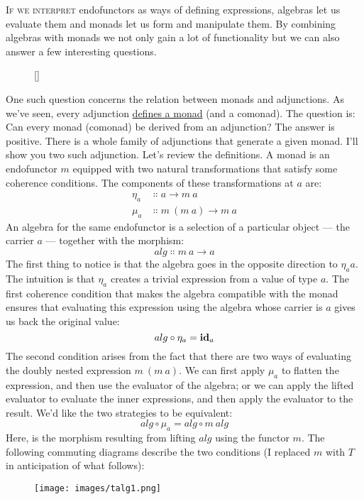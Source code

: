 \lettrine[lhang=0.17]{I}{f we interpret} endofunctors as ways of defining expressions, algebras
let us evaluate them and monads let us form and manipulate them. By
combining algebras with monads we not only gain a lot of functionality
but we can also answer a few interesting questions.
\begin{wrapfigure}[8]{R}{0pt}
\raisebox{0pt}[\dimexpr{}\baselineskip\relax]{
}%
\end{wrapfigure}

One such question
concerns the relation between monads and adjunctions. As we've seen,
every adjunction \hyperref[monads-categorically]{defines
a monad} (and a comonad). The question is: Can every monad (comonad) be
derived from an adjunction? The answer is positive. There is a whole
family of adjunctions that generate a given monad. I'll show you two
such adjunction.
Let's review the definitions. A monad is an endofunctor $m$
equipped with two natural transformations that satisfy some coherence
conditions. The components of these transformations at $a$ are:
\begin{align*}
\eta_a &\Colon a \to m\ a \\
\mu_a &\Colon m\ (m\ a) \to m\ a
\end{align*}
An algebra for the same endofunctor is a selection of a particular
object --- the carrier $a$ --- together with the morphism:
\[alg \Colon m\ a \to a\]
The first thing to notice is that the algebra goes in the opposite
direction to $\eta_aa$. The intuition is that $\eta_a$ creates a
trivial expression from a value of type $a$. The first coherence
condition that makes the algebra compatible with the monad ensures that
evaluating this expression using the algebra whose carrier is $a$
gives us back the original value:
\[alg \circ \eta_a = \mathbf{id}_a\]
The second condition arises from the fact that there are two ways of
evaluating the doubly nested expression $m\ (m\ a)$. We can first
apply $\mu_a$ to flatten the expression, and then use the evaluator
of the algebra; or we can apply the lifted evaluator to evaluate the
inner expressions, and then apply the evaluator to the result. We'd like
the two strategies to be equivalent:
\[alg \circ \mu_a = alg \circ m\ alg\]
Here,  is the morphism resulting from lifting
$alg$ using the functor $m$. The following commuting
diagrams describe the two conditions (I replaced $m$ with
$T$ in anticipation of what follows):

\begin{figure}[H]
\centering
\texttt{[image: images/talg1.png]}
\end{figure}

